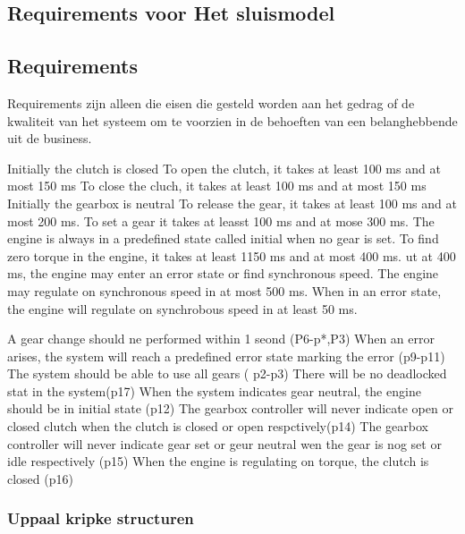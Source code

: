 {{{{{{{{{\subsection{Requirements voor Het sluismodel}


\subsection{Requirements}
Requirements zijn alleen die eisen die gesteld worden aan het gedrag of de kwaliteit van het systeem om te voorzien in de behoeften van een belanghebbende uit de business.



Initially the clutch is closed
To open the clutch, it takes at least 100 ms and at most 150 ms
To close the cluch, it takes at least 100 ms and at most 150 ms
Initially the gearbox is neutral
To release the gear, it takes at least 100 ms and at most 200 ms.
To set a gear it takes at leasst 100 ms and at mose 300 ms.
The engine is always in a predefined state called initial when no gear is set.
To find zero torque in the engine, it takes at least 1150 ms and at most 400 ms. ut at 400 ms, the engine may enter an error state or find synchronous speed.
The  engine may regulate on synchronous speed in at most 500 ms.
When in an error state, the engine will regulate on synchrobous speed in at least 50 ms.


A gear change should ne performed within 1 seond (P6-p*,P3)
When an error arises, the system will reach a predefined error state marking the error (p9-p11)
The system should be able to use all gears ( p2-p3)
There will be no deadlocked stat in the system(p17)
When the system indicates gear neutral, the engine should  be in initial state (p12)
The gearbox controller will never indicate open or closed clutch when the clutch is closed or open respctively(p14)
The gearbox controller will never indicate gear set or geur neutral wen the gear is nog set or idle respectively (p15)
When the engine is regulating on torque, the clutch is closed (p16)




\subsubsection{Uppaal kripke structuren}
















}}}}}}}}}
